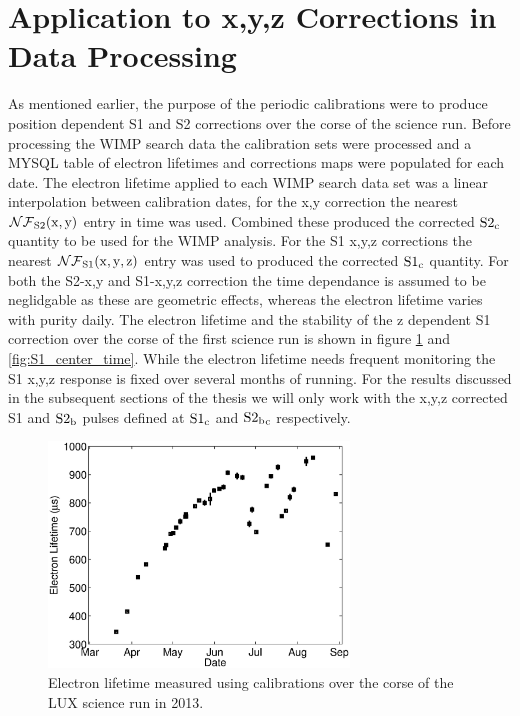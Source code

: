 \section{Application to x,y,z Corrections in Data Processing}

As mentioned earlier, the purpose of the periodic \KrCal calibrations were to produce position dependent S1 and S2 corrections over the corse of the science run. Before processing the WIMP search data the calibration sets were processed and a MYSQL table of electron lifetimes and corrections maps were populated for each date. The electron lifetime applied to each WIMP search data set was a linear interpolation between calibration dates, for the x,y correction the nearest $\rm \mathcal{NF}_{S2}(x,y)$ entry in time was used. Combined these produced the corrected $\rm S2_c$ quantity to be used for the WIMP analysis. For the S1 x,y,z corrections the nearest $\rm \mathcal{NF}_{S1}(x,y,z)$ entry was used to produced the corrected $\rm S1_c$ quantity. For both the S2-x,y and S1-x,y,z correction the time dependance is assumed to be neglidgable as these are geometric effects, whereas the electron lifetime varies with purity daily.
The electron lifetime and the stability of the z dependent S1 correction over the corse of the first science run is shown in figure \ref{fig:S2_EL_time} and \ref{fig:S1_center_time}. While the electron lifetime needs frequent monitoring the S1 x,y,z response is fixed over several months of running.
For the results discussed in the subsequent sections of the thesis we will only work with the x,y,z corrected S1 and $\rm S2_b$ pulses defined at $\rm S1_c$ and $\rm S2{_b}_c$ respectively.

\begin{figure}[h!]\centering
\includegraphics[width=80mm]{Chapter_XYZ_Corr/Thesis_Corr_Plots/lifetime_fig_2.eps}
\caption{Electron lifetime measured using \KrCal calibrations over the corse of the LUX science run in 2013.}
\label{fig:S2_EL_time}
\end{figure}

